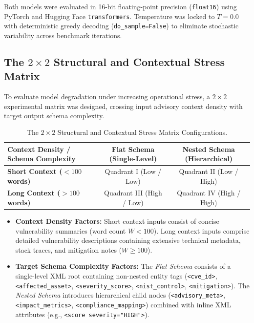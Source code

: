 \documentclass[11pt,a4paper]{article}
\begin{document}
Both models were evaluated in 16-bit floating-point precision (\texttt{float16}) using PyTorch and Hugging Face \texttt{transformers}. Temperature was locked to $T = 0.0$ with deterministic greedy decoding (\texttt{do\_sample=False}) to eliminate stochastic variability across benchmark iterations.

\subsection{The $2 \times 2$ Structural and Contextual Stress Matrix}
To evaluate model degradation under increasing operational stress, a $2 \times 2$ experimental matrix was designed, crossing input advisory context density with target output schema complexity.

\begin{table}[htbp]
\centering
\caption{The $2 \times 2$ Structural and Contextual Stress Matrix Configurations.}
\label{tab:stress_matrix}
\begin{tabular}{lcc}
\hline
\textbf{Context Density / Schema Complexity} & \textbf{Flat Schema (Single-Level)} & \textbf{Nested Schema (Hierarchical)} \\
\hline
\textbf{Short Context ($<100$ words)} & Quadrant I (Low / Low) & Quadrant II (Low / High) \\
\textbf{Long Context ($>100$ words)} & Quadrant III (High / Low) & Quadrant IV (High / High) \\
\hline
\end{tabular}
\end{table}

\begin{itemize}
    \item \textbf{Context Density Factors:} Short context inputs consist of concise vulnerability summaries (word count $W < 100$). Long context inputs comprise detailed vulnerability descriptions containing extensive technical metadata, stack traces, and mitigation notes ($W \ge 100$).
    \item \textbf{Target Schema Complexity Factors:} The \textit{Flat Schema} consists of a single-level XML root containing non-nested entity tags (\texttt{<cve\_id>}, \texttt{<affected\_asset>}, \texttt{<severity\_score>}, \texttt{<nist\_control>}, \texttt{<mitigation>}). The \textit{Nested Schema} introduces hierarchical child nodes (\texttt{<advisory\_meta>}, \texttt{<impact\_metrics>}, \texttt{<compliance\_mapping>}) combined with inline XML attributes (e.g., \texttt{<score severity="HIGH">}).
\end{itemize}
\end{document}
